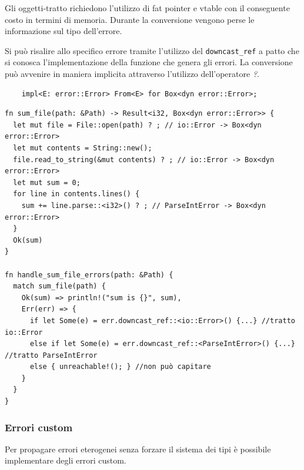
Gli oggetti-tratto richiedono l'utilizzo di fat pointer e vtable con il
conseguente costo in termini di memoria.
Durante la conversione vengono perse le informazione sul tipo dell'errore.

Si può risalire allo specifico errore tramite l'utilizzo del \texttt{downcast_ref} a
patto che si conosca l'implementazione della funzione che genera gli errori.
La conversione può avvenire in maniera implicita attraverso l'utilizzo
dell'operatore \textit{?}.

\begin{center}
  \centering
  \begin{verbatim}
    impl<E: error::Error> From<E> for Box<dyn error::Error>;
  \end{verbatim}
\end{center}

\begin{verbatim}
fn sum_file(path: &Path) -> Result<i32, Box<dyn error::Error>> {
  let mut file = File::open(path) ? ; // io::Error -> Box<dyn error::Error>
  let mut contents = String::new();
  file.read_to_string(&mut contents) ? ; // io::Error -> Box<dyn error::Error>
  let mut sum = 0;
  for line in contents.lines() {
    sum += line.parse::<i32>() ? ; // ParseIntError -> Box<dyn error::Error>
  }
  Ok(sum)
}

fn handle_sum_file_errors(path: &Path) {
  match sum_file(path) {
    Ok(sum) => println!("sum is {}", sum),
    Err(err) => {
      if let Some(e) = err.downcast_ref::<io::Error>() {...} //tratto io::Error
      else if let Some(e) = err.downcast_ref::<ParseIntError>() {...} //tratto ParseIntError
      else { unreachable!(); } //non può capitare
    }
  }
}
\end{verbatim}


\subsubsection{Errori custom}
Per propagare errori eterogenei senza forzare il sistema dei tipi è possibile
implementare degli errori custom.

